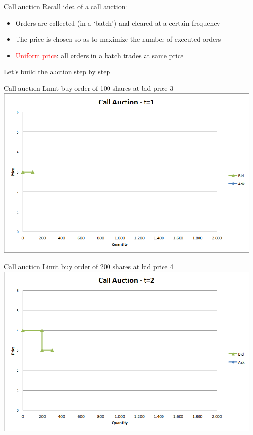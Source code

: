 \documentclass[english,10pt
,aspectratio=169
]{beamer}
\begin{document}
\begin{frame}{Call auction}
	Recall idea of a call auction:
	\begin{itemize}
		\item Orders are collected (in a `batch') and cleared at a certain frequency
		\item The price is chosen so as to maximize the number of executed orders
		\item \textcolor{red}{Uniform price}: all orders in a batch trades at same price
	\end{itemize}
	\quad
	Let's build the auction step by step
\end{frame}


\begin{frame}{Call auction}
	Limit buy order of 100 shares at bid price 3
	\quad
	\center
	\includegraphics[width=.75\linewidth]{pics/Call_t1}
\end{frame}


\begin{frame}{Call auction}
	Limit buy order of 200 shares at bid price 4
	\quad
	\center
	\includegraphics[width=.75\linewidth]{pics/Call_t2}
\end{frame}
\end{document}
